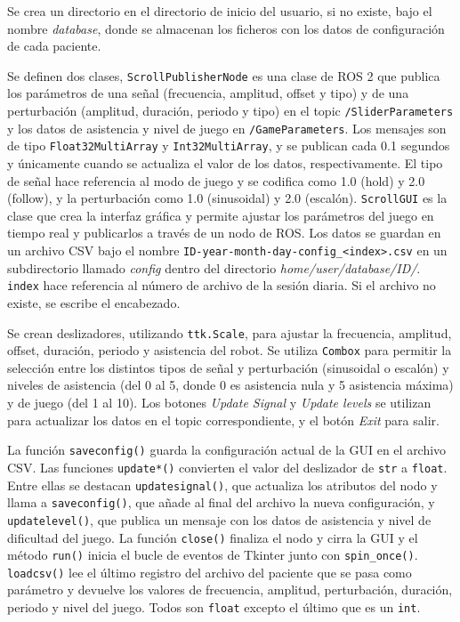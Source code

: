 Se crea un directorio en el directorio de inicio del usuario, si no existe, bajo el nombre \textit{database}, donde se almacenan los ficheros con los datos de configuración de cada paciente.

Se definen dos clases, \verb|ScrollPublisherNode| es una clase de ROS 2 que publica los parámetros de una señal (frecuencia, amplitud, offset y tipo) y de una perturbación (amplitud, duración, periodo y tipo) en el topic \verb|/SliderParameters| y los datos de asistencia y nivel de juego en \verb|/GameParameters|.
Los mensajes son de tipo \verb|Float32MultiArray| y \verb|Int32MultiArray|, y se publican cada 0.1 segundos y únicamente cuando se actualiza el valor de los datos, respectivamente.
El tipo de señal hace referencia al modo de juego y se codifica como 1.0 (hold) y 2.0 (follow), y la perturbación como 1.0 (sinusoidal) y 2.0 (escalón).
\verb|ScrollGUI| es la clase que crea la interfaz gráfica y permite ajustar los parámetros del juego en tiempo real y publicarlos a través de un nodo de ROS.
Los datos se guardan en un archivo CSV bajo el nombre \verb|ID-year-month-day-config_<index>.csv| en un subdirectorio llamado \textit{config} dentro del directorio \textit{home/user/database/ID/}.
\verb|index| hace referencia al número de archivo de la sesión diaria.
Si el archivo no existe, se escribe el encabezado.

Se crean deslizadores, utilizando \verb|ttk.Scale|, para ajustar la frecuencia, amplitud, offset, duración, periodo y asistencia del robot.
Se utiliza \verb|Combox| para permitir la selección entre los distintos tipos de señal y perturbación (sinusoidal o escalón) y niveles de asistencia (del 0 al 5, donde 0 es asistencia nula y 5 asistencia máxima) y de juego (del 1 al 10).
Los botones \textit{Update Signal} y \textit{Update levels} se utilizan para actualizar los datos en el topic correspondiente, y el botón \textit{Exit} para salir.

La función \verb|saveconfig()| guarda la configuración actual de la GUI en el archivo CSV.
Las funciones \verb|update*()| convierten el valor del deslizador de \verb|str| a \verb|float|.
Entre ellas se destacan \verb|updatesignal()|, que actualiza los atributos del nodo y llama a \verb|saveconfig()|, que añade al final del archivo la nueva configuración, y \verb|updatelevel()|, que publica un mensaje con los datos de asistencia y nivel de dificultad del juego.
La función \verb|close()| finaliza el nodo y cirra la GUI y el método \verb|run()| inicia el bucle de eventos de Tkinter junto con \verb|spin_once()|.
\verb|loadcsv()| lee el último registro del archivo del paciente que se pasa como parámetro y devuelve los valores de frecuencia, amplitud, perturbación, duración, periodo y nivel del juego.
Todos son \verb|float| excepto el último que es un \verb|int|.

